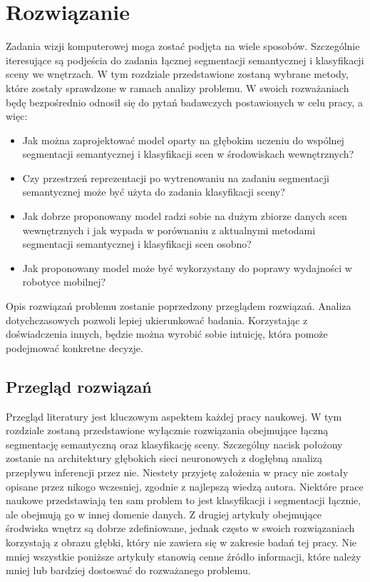 \newpage %
\section{Rozwiązanie}
Zadania wizji komputerowej moga zostać podjęta na wiele sposobów. Szczególnie iteresujące są podjeścia do zadania łącznej segmentacji semantycznej i klasyfikacji sceny we wnętrzach. W tym rozdziale przedstawione zostaną wybrane metody, które zostały sprawdzone w ramach analizy problemu. W swoich rozważaniach będę bezpośrednio odnosił się do pytań badawczych postawionych w celu pracy, a więc: 

\begin{itemize}
    \item Jak można zaprojektować model oparty na głębokim uczeniu do wspólnej segmentacji semantycznej i klasyfikacji scen w środowiskach wewnętrznych?
    \item Czy przestrzeń reprezentacji po wytrenowaniu na zadaniu segmentacji semantycznej może być użyta do zadania klasyfikacji sceny?
    \item Jak dobrze proponowany model radzi sobie na dużym zbiorze danych scen wewnętrznych i jak wypada w porównaniu z aktualnymi metodami segmentacji semantycznej i klasyfikacji scen osobno?
    \item Jak proponowany model może być wykorzystany do poprawy wydajności w robotyce mobilnej?
\end{itemize}
Opis rozwiązań problemu zostanie poprzedzony przeglądem rozwiązań. Analiza dotychczasowych pozwoli lepiej ukierunkować badania. Korzystając z doświadczenia innych, będzie można wyrobić sobie intuicję, która pomoże podejmować konkretne decyzje.

\subsection{Przegląd rozwiązań}
Przegląd literatury jest kluczowym aspektem każdej pracy naukowej. W tym rozdziale zostaną przedstawione wyłącznie rozwiązania obejmujące łączną segmentację semantyczną oraz klasyfikację sceny. Szczególny nacisk położony zostanie na architektury głębokich sieci neuronowych z dogłębną analizą przepływu inferencji przez nie.
\vspace{0.5cm}
Niestety przyjetę założenia w pracy nie zostały opisane przez nikogo wczesniej, zgodnie z najlepszą wiedzą autora. Niektóre prace naukowe przedstawiają ten sam problem to jest klasyfikacji i segmentacji łącznie, ale obejmują go w innej domenie danych. Z drugiej artykuły obejmujące środwiska wnętrz są dobrze zdefiniowane, jednak często w swoich rozwiązaniach korzystają z obrazu głębki, który nie zawiera się w zakresie badań tej pracy. Nie mniej wszystkie poniższe artykuły stanowią cenne źródło informacji, które należy mniej lub bardziej dostoswać do rozważanego problemu.


